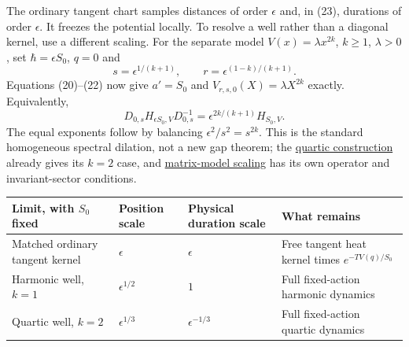\documentclass[11pt,a4paper]{article}
\begin{document}
The ordinary tangent chart samples distances of order \(\epsilon\) and,
in (23), durations of order \(\epsilon\). It freezes the potential
locally. To resolve a well rather than a diagonal kernel, use a
different scaling. For the separate model \(V(x)=\lambda x^{2k}\),
\(k\ge1\), \(\lambda>0\), set \(\hbar=\epsilon S_0\), \(q=0\) and \[
 s=\epsilon^{1/(k+1)},\qquad
 r=\epsilon^{(1-k)/(k+1)}.
 \tag{32}
\] Equations (20)--(22) now give \(a'=S_0\) and
\(V_{r,s,0}(X)=\lambda X^{2k}\) exactly. Equivalently, \[
 D_{0,s}H_{\epsilon S_0,V}D_{0,s}^{-1}
 =\epsilon^{2k/(k+1)}H_{S_0,V}.
 \tag{33}
\] The equal exponents follow by balancing \(\epsilon^2/s^2=s^{2k}\).
This is the standard homogeneous spectral dilation, not a new gap
theorem; the
\href{constructive-qft-one-time.md\#2-a-vacuum-and-a-gap-from-the-hamiltonian}{quartic
construction} already gives its \(k=2\) case, and
\href{low-dimensional-mass-gap.md\#2-the-exact-hbar-scaling-of-spectra-for-homogeneous-potentials}{matrix-model
scaling} has its own operator and invariant-sector conditions.

\begin{longtable}[]{@{}
  >{\raggedright\arraybackslash}p{}
  >{\raggedright\arraybackslash}p{}
  >{\raggedright\arraybackslash}p{}
  >{\raggedright\arraybackslash}p{}@{}}
\toprule\noalign{}
\begin{minipage}[b]{\linewidth}\raggedright
Limit, with \(S_0\) fixed
\end{minipage} & \begin{minipage}[b]{\linewidth}\raggedright
Position scale
\end{minipage} & \begin{minipage}[b]{\linewidth}\raggedright
Physical duration scale
\end{minipage} & \begin{minipage}[b]{\linewidth}\raggedright
What remains
\end{minipage} \\
\midrule\noalign{}
\endhead
\bottomrule\noalign{}
\endlastfoot
Matched ordinary tangent kernel & \(\epsilon\) & \(\epsilon\) & Free
tangent heat kernel times \(e^{-TV(q)/S_0}\) \\
Harmonic well, \(k=1\) & \(\epsilon^{1/2}\) & \(1\) & Full fixed-action
harmonic dynamics \\
Quartic well, \(k=2\) & \(\epsilon^{1/3}\) & \(\epsilon^{-1/3}\) & Full
fixed-action quartic dynamics \\
\end{longtable}
\end{document}
